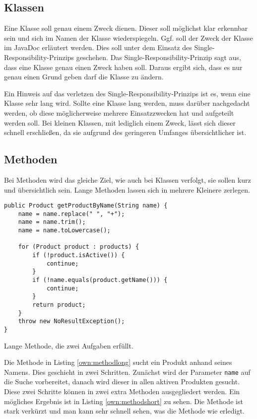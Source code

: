 \subsection{Klassen}
Eine Klasse soll genau einem Zweck dienen. Dieser soll möglichst klar erkennbar sein und sich im Namen der Klasse wiederspiegeln. Ggf. soll der Zweck der Klasse im JavaDoc erläutert werden. Dies soll unter dem Einsatz des Single-Responsibility-Prinzips geschehen. Das Single-Responsibility-Prinzip sagt aus, dass eine Klasse genau einen Zweck haben soll. Daraus ergibt sich, dass es nur genau einen Grund geben darf die Klasse zu ändern. \cite[S. 176f.]{Martin}

Ein Hinweis auf das verletzen des Single-Responsibility-Prinzips ist es, wenn eine Klasse sehr lang wird. Sollte eine Klasse lang werden, muss darüber nachgedacht werden, ob diese möglicherweise mehrere Einsatzzwecken hat und aufgeteilt werden soll. Bei kleinen Klassen, mit lediglich einem Zweck, lässt sich dieser schnell erschließen, da sie aufgrund des geringeren Umfanges übersichtlicher ist.

\subsection{Methoden}

Bei Methoden wird das gleiche Ziel, wie auch bei Klassen verfolgt, sie sollen kurz und übersichtlich sein. Lange Methoden lassen sich in mehrere Kleinere zerlegen.

\begin{listing}[H]
    \begin{verbatim}
public Product getProductByName(String name) {
    name = name.replace(" ", "+");
    name = name.trim();
    name = name.toLowercase();
    
    for (Product product : products) {
        if (!product.isActive()) {
            continue;
        }
        if (!name.equals(product.getName())) {
            continue;
        }
        return product;
    }
    throw new NoResultException();
}
    \end{verbatim}
    \caption{Lange Methode, die zwei Aufgaben erfüllt.}
    \label{own:methodlong}
\end{listing}

Die Methode in Listing \ref{own:methodlong} sucht ein Produkt  anhand seines Namens. Dies geschieht in zwei Schritten. Zunächst wird der Parameter \texttt{name} auf die Suche vorbereitet, danach wird dieser in allen aktiven Produkten gesucht. Diese zwei Schritte können in zwei extra Methoden ausgegliedert werden. Ein mögliches Ergebnis ist in Listing \ref{own:methodshort} zu sehen. Die Methode ist stark verkürzt und man kann sehr schnell sehen, was die Methode wie erledigt.

